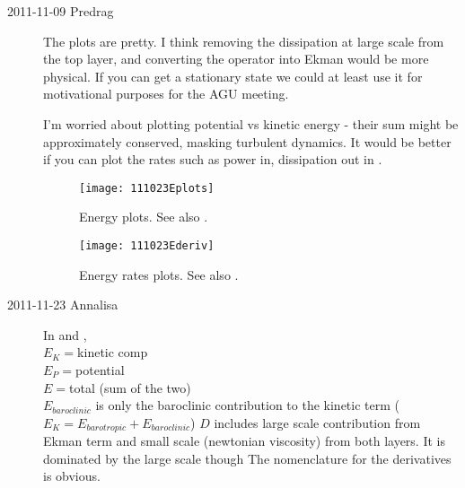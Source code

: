 \begin{description}
\item[2011-11-09 Predrag] The plots are pretty. I think removing the
dissipation at large scale from the top layer, and converting the
operator into Ekman would be more physical. If you can get a stationary
state we could at least use it for motivational purposes for the AGU
meeting.

I'm worried about plotting potential vs kinetic energy - their sum might
be approximately conserved, masking turbulent dynamics. It would be
better if you can plot the rates such as power in, dissipation out in
.

\begin{figure}%
\begin{center}
    \texttt{[image: 111023Eplots]}
\end{center}
\caption{
Energy plots.
See also .
        }
\label{f:111023Eplots}
\end{figure}


\begin{figure}%
\begin{center}
    \texttt{[image: 111023Ederiv]}
\end{center}
\caption{
Energy rates plots.
See also .
        }
\label{f:111023Ederiv}
\end{figure}

\item[2011-11-23 Annalisa]
In  and ,
\\
$E_K=$kinetic comp \\
$E_P=$potential \\
$E=$total (sum of the two) \\
$E_{baroclinic}$ is only the baroclinic contribution to the kinetic term
($E_K=E_{barotropic}+E_{baroclinic}$)
$D$ includes large scale contribution from Ekman term and small scale
(newtonian viscosity) from both layers. It is dominated by the large
scale though
The nomenclature for the derivatives is obvious.


\end{description}
